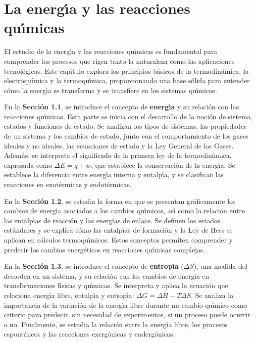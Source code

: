 \chapter[Energ\'{\i}a y reacciones]{La energ\'{\i}a y las reacciones qu\'{\i}micas}

El estudio de la energ\'{\i}a y las reacciones qu\'{\i}micas es fundamental para comprender los procesos que rigen tanto la naturaleza como las aplicaciones tecnol\'ogicas. Este cap\'{\i}tulo explora los principios b\'asicos de la termodin\'amica, la electroqu\'{\i}mica y la termoqu\'{\i}mica, proporcionando una base s\'olida para entender c\'omo la energ\'{\i}a se transforma y se transfiere en los sistemas qu\'{\i}micos.

En la \textbf{Secci\'on 1.1}, se introduce el concepto de \textbf{energ\'{\i}a} y su relaci\'on con las reacciones qu\'{\i}micas. Esta parte se inicia con el desarrollo de la noci\'on de sistema, estados y funciones de estado. Se analizan los tipos de sistemas, las propiedades de un sistema y los cambios de estado, junto con el comportamiento de los gases ideales y no ideales, las ecuaciones de estado y la Ley General de los Gases. Adem\'as, se interpreta el significado de la primera ley de la termodin\'amica, expresada como $\Delta E = q + w$, que establece la conservaci\'on de la energ\'{\i}a. Se establece la diferencia entre energ\'{\i}a interna y entalp\'{\i}a, y se clasifican las reacciones en exot\'ermicas y endot\'ermicas.

En la \textbf{Secci\'on 1.2}, se estudia la forma en que se presentan gr\'aficamente los cambios de energ\'{\i}a asociados a los cambios qu\'{\i}micos, as\'{\i} como la relaci\'on entre las entalp\'{\i}as de reacci\'on y las energ\'{\i}as de enlace. Se definen los estados est\'andares y se explica c\'omo las entalp\'{\i}as de formaci\'on y la Ley de Hess se aplican en c\'alculos termoqu\'{\i}micos. Estos conceptos permiten comprender y predecir los cambios energ\'eticos en reacciones qu\'{\i}micas complejas.

En la \textbf{Secci\'on 1.3}, se introduce el concepto de \textbf{entrop\'{\i}a} ($\Delta S$), una medida del desorden en un sistema, y su relaci\'on con los cambios de energ\'{\i}a en transformaciones f\'{\i}sicas y qu\'{\i}micas. Se interpreta y aplica la ecuaci\'on que relaciona energ\'{\i}a libre, entalp\'{\i}a y entrop\'{\i}a: $\Delta G = \Delta H - T \Delta S$. Se analiza la importancia de la variaci\'on de la energ\'{\i}a libre durante un cambio qu\'{\i}mico como criterio para predecir, sin necesidad de experimentos, si un proceso puede ocurrir o no. Finalmente, se estudia la relaci\'on entre la energ\'{\i}a libre, los procesos espont\'aneos y las reacciones exerg\'onicas y enderg\'onicas.

